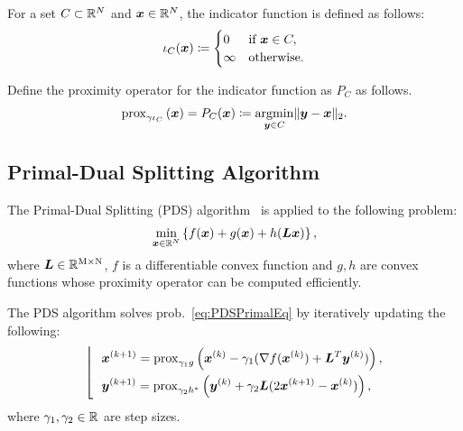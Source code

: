 For a set $C \subset \mathbb{R}^N$ and $\bm{x} \in \mathbb{R}^N$, the indicator function is defined as follows:
\begin{equation} \label{eq:IndicatorFunctionDefinitionEq} \iota_{C}(\bm{x}) \coloneq \begin{cases} 0 & \text{if } \bm{x} \in C, \\ \infty & \text{otherwise}. \end{cases} \end{equation}

Define the proximity operator for the indicator function as $P_C$ as follows.
\begin{equation} \label{eq:ProximityOperatorDefinitionWithIndicatorFunctionEq}
\mathrm{prox}_{ \gamma \iota_{C} }\left(\bm{x}\right) = P_C(\bm{x}) \coloneq \underset{\bm{y} \in C}{\mathrm{argmin}} \lVert \bm{y} - \bm{x} \rVert _2.
\end{equation}


\subsection{Primal-Dual Splitting Algorithm}\label{subsec:primal-dual-splitting-algorithm}
The Primal-Dual Splitting (PDS) algorithm~\cite{PDS0,PDS1,PDS2,PDS3} is applied to the following problem:
\begin{equation} \label{eq:PDSPrimalEq} \underset{ \bm{x} \in \mathbb{R}^N }{\mathrm{min}} \left\{ f(\bm{x}) + g(\bm{x}) + h(\bm{L} \bm{x}) \right\}, \end{equation}
where $\bm{L} \in \mathbb{R}^{\mathrm{M} \times \mathrm{N}}$, $f$ is a differentiable convex function and $g,h$ are convex functions whose proximity operator can be computed efficiently.

The PDS algorithm solves prob.~\eqref{eq:PDSPrimalEq} by iteratively updating the following:
\begin{equation} \label{eq:PDSSubStep} \left \lfloor \ \ \begin{aligned} & \bm{x}^{(k+1)} = \mathrm{prox}_{\gamma_1 g}\left(\bm{x}^{(k)} - \gamma_1( \nabla f(\bm{x}^{(k)}) + \bm{L}^T \bm{y}^{(k)} )\right), \\ & \bm{y}^{(k+1)} = \mathrm{prox}_{\gamma_2 h^*}\left(\bm{y}^{(k)} + \gamma_2 \bm{L} (2\bm{x}^{(k+1)} - \bm{x}^{(k)}) \right), \\ \end{aligned} \right. \end{equation}
where $\gamma_1, \gamma_2 \in \mathbb{R}$ are step sizes.



